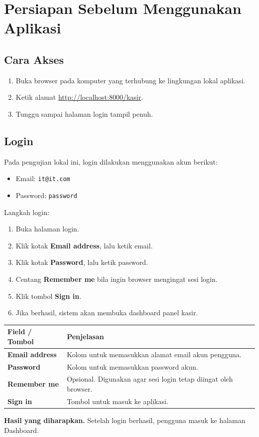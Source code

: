 \documentclass[12pt,a4paper]{article}
\newcommand{\FieldTableStart}{
\begin{longtable}{L{0.30\textwidth}L{0.64\textwidth}}
\toprule
\textbf{Field / Tombol} & \textbf{Penjelasan} \\
\midrule
\endhead
}
\newcommand{\FieldTableEnd}{
\bottomrule
\end{longtable}
}
\newcommand{\FieldRow}[2]{
\textbf{#1} & #2 \\
}
\begin{document}
\section{Persiapan Sebelum Menggunakan Aplikasi}
\subsection{Cara Akses}
\begin{enumerate}
    \item Buka browser pada komputer yang terhubung ke lingkungan lokal aplikasi.
    \item Ketik alamat \url{http://localhost:8000/kasir}.
    \item Tunggu sampai halaman login tampil penuh.
\end{enumerate}

\subsection{Login}
Pada pengujian lokal ini, login dilakukan menggunakan akun berikut:
\begin{itemize}
    \item Email: \texttt{it@it.com}
    \item Password: \texttt{password}
\end{itemize}

Langkah login:
\begin{enumerate}
    \item Buka halaman login.
    \item Klik kotak \textbf{Email address}, lalu ketik email.
    \item Klik kotak \textbf{Password}, lalu ketik password.
    \item Centang \textbf{Remember me} bila ingin browser mengingat sesi login.
    \item Klik tombol \textbf{Sign in}.
    \item Jika berhasil, sistem akan membuka dashboard panel kasir.
\end{enumerate}

\FieldTableStart
\FieldRow{Email address}{Kolom untuk memasukkan alamat email akun pengguna.}
\FieldRow{Password}{Kolom untuk memasukkan password akun.}
\FieldRow{Remember me}{Opsional. Digunakan agar sesi login tetap diingat oleh browser.}
\FieldRow{Sign in}{Tombol untuk masuk ke aplikasi.}
\FieldTableEnd

\textbf{Hasil yang diharapkan.} Setelah login berhasil, pengguna masuk ke halaman Dashboard.
\end{document}

